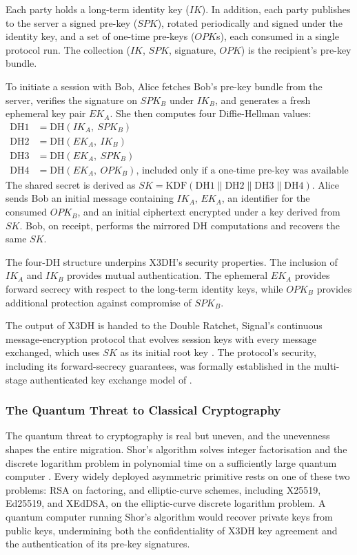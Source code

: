 Each party holds a long-term identity key ($IK$). In addition, each party publishes to the server a signed pre-key ($SPK$), rotated periodically and signed under the identity key, and a set of one-time pre-keys ($OPK$s), each consumed in a single protocol run. The collection ($IK$, $SPK$, signature, $OPK$) is the recipient's pre-key bundle.

To initiate a session with Bob, Alice fetches Bob's pre-key bundle from the server, verifies the signature on $SPK_B$ under $IK_B$, and generates a fresh ephemeral key pair $EK_A$. She then computes four Diffie-Hellman values:
\begin{align*}
\mathrm{DH1} &= \mathrm{DH}(IK_A,\ SPK_B)\\
\mathrm{DH2} &= \mathrm{DH}(EK_A,\ IK_B)\\
\mathrm{DH3} &= \mathrm{DH}(EK_A,\ SPK_B)\\
\mathrm{DH4} &= \mathrm{DH}(EK_A,\ OPK_B)\text{, included only if a one-time pre-key was available}
\end{align*}
The shared secret is derived as $SK = \mathrm{KDF}(\mathrm{DH1} \parallel \mathrm{DH2} \parallel \mathrm{DH3} \parallel \mathrm{DH4})$. Alice sends Bob an initial message containing $IK_A$, $EK_A$, an identifier for the consumed $OPK_B$, and an initial ciphertext encrypted under a key derived from $SK$. Bob, on receipt, performs the mirrored DH computations and recovers the same $SK$.

The four-DH structure underpins X3DH's security properties. The inclusion of $IK_A$ and $IK_B$ provides mutual authentication. The ephemeral $EK_A$ provides forward secrecy with respect to the long-term identity keys, while $OPK_B$ provides additional protection against compromise of $SPK_B$.

The output of X3DH is handed to the Double Ratchet, Signal's continuous message-encryption protocol that evolves session keys with every message exchanged, which uses $SK$ as its initial root key \cite{perrin_double_nodate}. The protocol's security, including its forward-secrecy guarantees, was formally established in the multi-stage authenticated key exchange model of \cite{cohn-gordon_formal_2020}.

\subsubsection{The Quantum Threat to Classical Cryptography}
\label{subsubsec:quantum-threat}

The quantum threat to cryptography is real but uneven, and the unevenness shapes the entire migration. Shor's algorithm solves integer factorisation and the discrete logarithm problem in polynomial time on a sufficiently large quantum computer \cite{shor_algorithms_1994}. Every widely deployed asymmetric primitive rests on one of these two problems: RSA on factoring, and elliptic-curve schemes, including X25519, Ed25519, and XEdDSA, on the elliptic-curve discrete logarithm problem. A quantum computer running Shor's algorithm would recover private keys from public keys, undermining both the confidentiality of X3DH key agreement and the authentication of its pre-key signatures.

